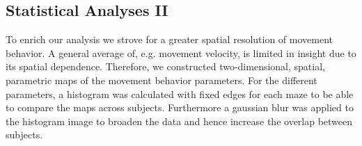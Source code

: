 \subsection{Statistical Analyses II} To enrich our analysis we strove for a greater spatial resolution of movement behavior. A general average of, e.g. movement velocity, is limited in insight due to its spatial dependence. Therefore, we constructed two-dimensional, spatial, parametric maps of the movement behavior parameters. For the different parameters, a histogram was calculated with fixed edges for each maze to be able to compare the maps across subjects. Furthermore a gaussian blur was applied to the histogram image to broaden the data and hence increase the overlap between subjects.

